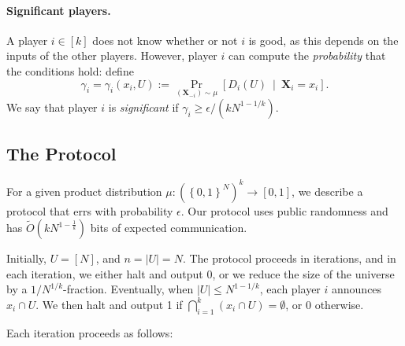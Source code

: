 \documentclass{article}
\newcommand{\set}[1]{\left\{#1\right\}}
\newcommand{\coloneq}{:=}
\newcommand{\eps}{\epsilon}
\newcommand{\given}{\medspace \middle| \medspace}
\newcommand{\rv}[1]{\mathbf{#1}}
\theoremstyle{plain}
\begin{document}
\paragraph{Significant players.}
A player $i \in [k]$ does not know whether or not $i$ is good,
as this depends on the inputs of the other players.
However, player $i$ can compute the \emph{probability} that the conditions hold:
define
\begin{equation*}
  \gamma_i = \gamma_i(x_i, U) \coloneq \Pr_{(\rv{X}_{-i}) \sim \mu}\left[ D_i(U) \given \rv{X}_i = x_i \right].
\end{equation*}
We say that player $i$ is \emph{significant} if $\gamma_i \geq \eps / (kN^{1-1/k})$.

\subsection{The Protocol}

For a given product distribution $\mu : \left(\set{0,1}^N\right)^k \rightarrow [0,1]$, we describe a protocol that errs with probability $\epsilon$.
Our protocol uses public randomness and has $\tilde{O}(kN^{1-\frac{1}{k}})$ bits of expected communication.

Initially, $U = [N]$, and $n = |U| = N$.
The protocol proceeds in iterations, and in each iteration, we either halt and output 0,
or we reduce the size of the universe by a $1/N^{1/k}$-fraction.
Eventually, when $|U| \leq N^{1-1/k}$, each player $i$ announces $x_i \cap U$.
We then halt and output 1 if $\bigcap_{i = 1}^k (x_i \cap U) = \emptyset$, or 0 otherwise.

Each iteration proceeds as follows:
\end{document}
